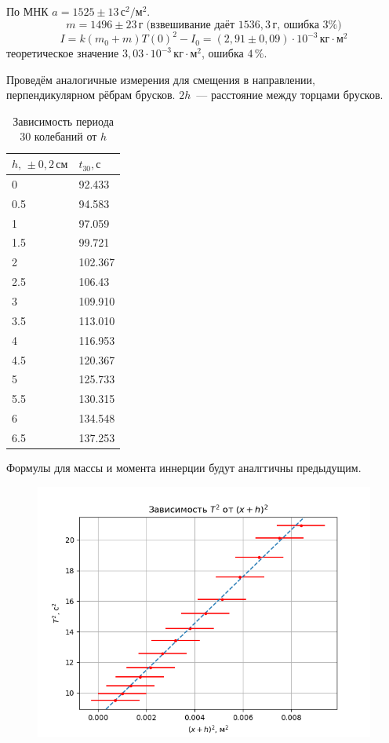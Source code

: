 По МНК $a=1525\pm 13\,\text{с}^2/\text{м}^2$.
\[m=1496\pm 23\,\text{г}\;\text{(взвешивание даёт $1536{,}3\,\text{г}$, ошибка $3\%$)}\]
\[I=k(m_0+m)T(0)^2-I_0=\left(2{,}91\pm 0{,}09\right)\cdot 10^{-3}\,\text{кг}\cdot\text{м}^2\]
теоретическое значение $3{,}03\cdot 10^{-3}\,\text{кг}\cdot\text{м}^2$, ошибка $4\,\%$.

Проведём аналогичные измерения для смещения в направлении, перпендикулярном рёбрам брусков.
$2h$~--- расстояние между торцами брусков.

\begin{table}[!ht]
    \centering
    \caption{Зависимость периода 30 колебаний от $h$}
    \begin{tabular}{|l|l|}
    \hline
        $h,\,\pm 0{,}2\,\text{см}$ & $t_{30},\text{с}$ \\ \hline
        0 & 92.433 \\ \hline
        0.5 & 94.583 \\ \hline
        1 & 97.059 \\ \hline
        1.5 & 99.721 \\ \hline
        2 & 102.367 \\ \hline
        2.5 & 106.43 \\ \hline
        3 & 109.910 \\ \hline
        3.5 & 113.010 \\ \hline
        4 & 116.953 \\ \hline
        4.5 & 120.367 \\ \hline
        5 & 125.733 \\ \hline
        5.5 & 130.315 \\ \hline
        6 & 134.548 \\ \hline
        6.5 & 137.253 \\ \hline
    \end{tabular}
\end{table}

Формулы для массы и момента иннерции будут аналггичны предыдущим.

\begin{figure}[ht!]
    \centering\includegraphics[width=0.8\linewidth]{img/fucking-plot.png}
\end{figure}


